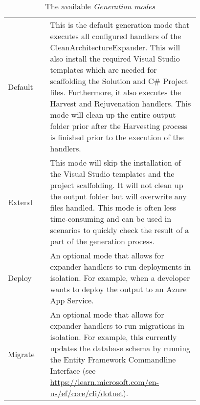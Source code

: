 \begin{table}[H]
    \begin{tabular}{ l | p{0.78\linewidth}}
        \toprule
Default & This is the default generation mode that executes all configured handlers of the
CleanArchitectureExpander. This will also install the required Visual Studio templates
which are needed for scaffolding the Solution and C\# Project files. Furthermore, it also
executes the Harvest and Rejuvenation handlers. This mode will clean up the entire output
folder prior after the Harvesting process is finished prior to the execution of the
handlers. \\
        
Extend & This mode will skip the installation of the Visual Studio templates and the
project scaffolding. It will not clean up the output folder but will overwrite any files
handled. This mode is often less time-consuming and can be used in scenarios to quickly
check the result of a part of the generation process. \\

Deploy & An optional mode that allows for expander handlers to run deployments in
isolation. For example, when a developer wants to deploy the output to an Azure App
Service. \\
       
Migrate & An optional mode that allows for expander handlers to run migrations in
isolation. For example, this  currently updates the database schema by running the Entity
Framework Commandline Interface (see
\url{https://learn.microsoft.com/en-us/ef/core/cli/dotnet}).\\
        \bottomrule
    \end{tabular}
    \caption{The available \emph{Generation modes}}
    \label{appendix_tab_generation_modes}
\end{table}